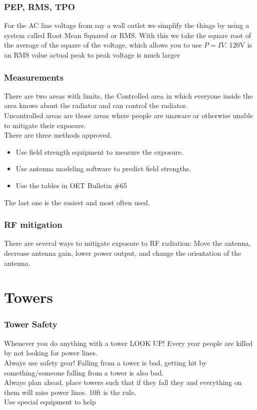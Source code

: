 \documentclass[10pt]{beamer}
\begin{document}
\begin{frame}
\frametitle{PEP, RMS, TPO}
For the AC line voltage from say a wall outlet we simplify the things by using a system called Root Mean Squared or RMS. With this we take the square root of the average of the square of the voltage, which allows you to use $P=IV$. 120V is an RMS value actual peak to peak voltage is much larger
\end{frame}

\begin{frame}
\frametitle{Measurements}
There are two areas with limits, the Controlled area in which everyone inside the area knows about the radiator and can control the radiator.\\
Uncontrolled areas are those areas where people are unaware or otherwise unable to mitigate their exposure.\\
There are three methods approved.
\begin{itemize}
\item Use field strength equipment to measure the exposure.
\item Use antenna modeling software to predict field strengths.
\item Use the tables in OET Bulletin \#65
\end{itemize}
The last one is the easiest and most often used.
\end{frame}

\begin{frame}
\frametitle{RF mitigation}
There are several ways to mitigate exposure to RF radiation: Move the antenna, decrease antenna gain, lower power output, and change the orientation of the antenna.
\end{frame}

\section{Towers}
\begin{frame}
\frametitle{Tower Safety}
Whenever you do anything with a tower LOOK UP! Every year people are killed by not looking for power lines.\\
Always use safety gear! Falling from a tower is bad, getting hit by something/someone falling from a tower is also bad.\\
Always plan ahead, place towers such that if they fall they and everything on them will miss power lines. 10ft is the rule.\\
Use special equipment to help
\end{frame}
\end{document}
